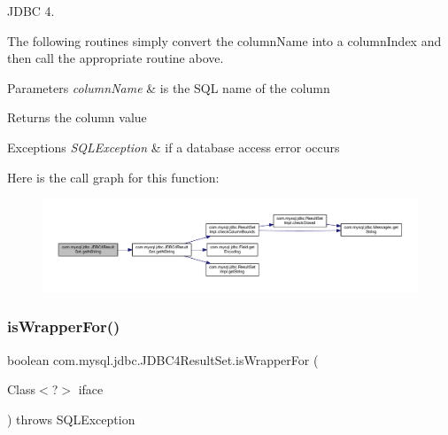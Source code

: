 J\+D\+BC 4.

The following routines simply convert the column\+Name into a column\+Index and then call the appropriate routine above.


\begin{DoxyParams}{Parameters}
{\em column\+Name} & is the S\+QL name of the column\\
\hline
\end{DoxyParams}
\begin{DoxyReturn}{Returns}
the column value
\end{DoxyReturn}

\begin{DoxyExceptions}{Exceptions}
{\em S\+Q\+L\+Exception} & if a database access error occurs \\
\hline
\end{DoxyExceptions}
Here is the call graph for this function\+:
\nopagebreak
\begin{figure}[H]
\begin{center}
\leavevmode
\includegraphics[width=350pt]{classcom_1_1mysql_1_1jdbc_1_1_j_d_b_c4_result_set_a01c74243228097fa36990664acb399bd_cgraph}
\end{center}
\end{figure}
\mbox{\label{classcom_1_1mysql_1_1jdbc_1_1_j_d_b_c4_result_set_a57d383b2ccf7020664d948a4fc2c09ea}} 
\subsubsection{\texorpdfstring{is\+Wrapper\+For()}{isWrapperFor()}}
{\footnotesize\ttfamily boolean com.\+mysql.\+jdbc.\+J\+D\+B\+C4\+Result\+Set.\+is\+Wrapper\+For (\begin{DoxyParamCaption}\item[{Class$<$?$>$}]{iface }\end{DoxyParamCaption}) throws S\+Q\+L\+Exception}

